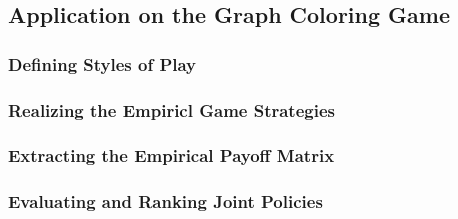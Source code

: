 \subsection{Application on the Graph Coloring Game}

\subsubsection{Defining Styles of Play}
\subsubsection{Realizing the Empiricl Game Strategies}
\subsubsection{Extracting the Empirical Payoff Matrix}
\subsubsection{Evaluating and Ranking Joint Policies}